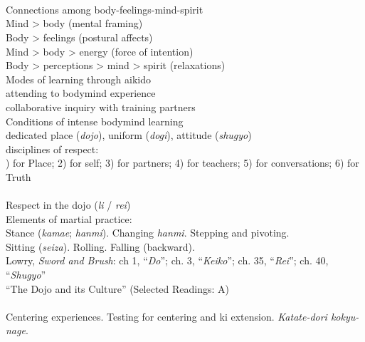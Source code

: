  \\
 \\
 \\
\indent Connections among body-feelings-mind-spirit \\
\indent \indent Mind \textgreater{} body (mental framing) \\
\indent \indent Body \textgreater{} feelings (postural affects) \\
\indent \indent Mind \textgreater{} body \textgreater{} energy (force of intention) \\
\indent \indent Body \textgreater{} perceptions \textgreater{} mind \textgreater{} spirit (relaxations) \\
\indent Modes of learning through aikido \\
\indent \indent attending to bodymind experience  \\
\indent \indent collaborative inquiry with training partners \\
\indent Conditions of intense bodymind learning \\
\indent \indent dedicated place (\emph{dojo}), uniform (\emph{dogi}), attitude (\emph{shugyo})  \\
\indent \indent disciplines of respect: \\
\indent \indent {}) for Place; 2) for self; 3) for partners; 4) for teachers; 5) for conversations; 6) for Truth \\
 \\
\indent Respect in the dojo (\emph{li} / \emph{rei}) \\
\indent Elements of martial practice: \\
\indent \indent Stance (\emph{kamae}; \emph{hanmi}). Changing \emph{hanmi}. Stepping and pivoting.  \\
\indent \indent Sitting (\emph{seiza}). Rolling. Falling (backward). \\
\indent Lowry, \emph{Sword and Brush}: ch 1, ``\emph{Do}''; ch. 3, ``\emph{Keiko}''; ch. 35, ``\emph{Rei}''; ch. 40, ``\emph{Shugyo}'' \\
\indent ``The Dojo and its Culture'' (Selected Readings: A) \\
 \\
\indent Centering experiences. Testing for centering and ki extension. \emph{Katate-dori kokyu-nage}. \\
